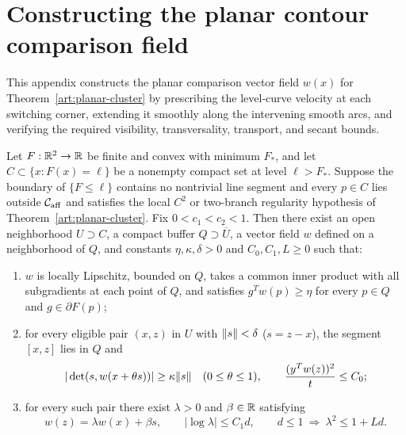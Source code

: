 \section{Constructing the planar contour comparison field}\label{art:planar-appendix}

This appendix constructs the planar comparison vector field $w(x)$ for
Theorem~\ref{art:planar-cluster} by prescribing the level-curve velocity at each
switching corner, extending it smoothly along the intervening smooth arcs, and
verifying the required visibility, transversality, transport, and secant bounds.

\begin{lemma}\label{art:planar-field}
Let $F:\mathbb R^2\to\mathbb R$ be finite and convex with minimum $F_*$, and let
$C\subset\{x:F(x)=\ell\}$ be a nonempty compact set at level $\ell>F_*$.
Suppose the boundary of $\{F\le\ell\}$ contains no nontrivial line segment and
every $p\in C$ lies outside $\mathcal C_{\rm aff}$ and satisfies the local $C^2$
or two-branch regularity hypothesis of Theorem~\ref{art:planar-cluster}. Fix
$0<c_1<c_2<1$. Then there exist an open neighborhood $U\supset C$, a compact
buffer $Q\supset\overline U$, a vector field $w$ defined on a neighborhood of
$Q$, and constants $\eta,\kappa,\delta>0$ and $C_0,C_1,L\ge0$ such that:
\begin{enumerate}
\item $w$ is locally Lipschitz, bounded on $Q$, takes a common inner product
with all subgradients at each point of $Q$, and satisfies $g^Tw(p)\ge\eta$ for
every $p\in Q$ and $g\in\partial F(p)$;
\item for every eligible pair $(x,z)$ in $U$ with $\lVert s\rVert<\delta$ ($s=z-x$),
the segment $[x,z]$ lies in $Q$ and
\[
 |\det(s,w(x+\theta s))|\ge\kappa\lVert s\rVert
 \quad(0\le\theta\le1),\qquad \frac{(y^Tw(z))^2}{t}\le C_0;
\]
\item for every such pair there exist $\lambda>0$ and $\beta\in\mathbb R$ satisfying
\[
 w(z)=\lambda w(x)+\beta s,\qquad
 |\log\lambda|\le C_1d,
 \qquad d\le1\ \Longrightarrow\ \lambda^2\le1+Ld.
\]
\end{enumerate}
\end{lemma}
